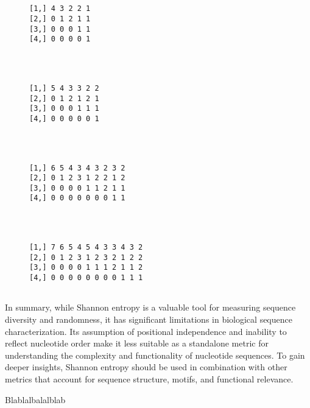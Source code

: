 \documentclass[
  letterpaper,
]{article}
\begin{document}
\begin{figure}

\begin{minipage}{0.50\linewidth}

\begin{verbatim}

               
[1,] 4 3 2 2 1 
[2,] 0 1 2 1 1 
[3,] 0 0 0 1 1 
[4,] 0 0 0 0 1 
    
\end{verbatim}

\end{minipage}%
%
\begin{minipage}{0.50\linewidth}

\begin{verbatim}

                 
[1,] 5 4 3 3 2 2 
[2,] 0 1 2 1 2 1 
[3,] 0 0 0 1 1 1 
[4,] 0 0 0 0 0 1 
    
\end{verbatim}

\end{minipage}%
\newline
\begin{minipage}{0.50\linewidth}

\begin{verbatim}

                       
[1,] 6 5 4 3 4 3 2 3 2 
[2,] 0 1 2 3 1 2 2 1 2 
[3,] 0 0 0 0 1 1 2 1 1 
[4,] 0 0 0 0 0 0 0 1 1 
    
\end{verbatim}

\end{minipage}%
%
\begin{minipage}{0.50\linewidth}

\begin{verbatim}

                           
[1,] 7 6 5 4 5 4 3 3 4 3 2 
[2,] 0 1 2 3 1 2 3 2 1 2 2 
[3,] 0 0 0 0 1 1 1 2 1 1 2 
[4,] 0 0 0 0 0 0 0 0 1 1 1 
    
\end{verbatim}

\end{minipage}%

\end{figure}%

In summary, while Shannon entropy is a valuable tool for measuring
sequence diversity and randomness, it has significant limitations in
biological sequence characterization. Its assumption of positional
independence and inability to reflect nucleotide order make it less
suitable as a standalone metric for understanding the complexity and
functionality of nucleotide sequences. To gain deeper insights, Shannon
entropy should be used in combination with other metrics that account
for sequence structure, motifs, and functional relevance.

Blablalbalalblab
\end{document}
